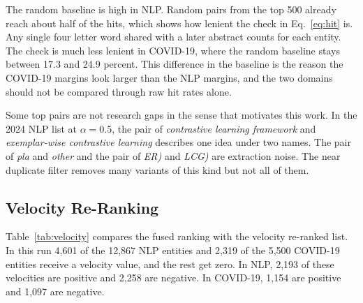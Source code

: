 \documentclass{ieeeaccess}
\begin{document}
\begin{table}[t]
\caption{Hit rate in percent of the ranking at $\alpha = 0.5$ against the two references. Each value is out of 75 pairs.}
\label{tab:hitrate}
\footnotesize
\setlength{\tabcolsep}{3pt}
\end{table}

The random baseline is high in NLP. Random pairs from the top 500 already reach about half of the hits, which shows how lenient the check in Eq.~\eqref{eq:hit} is. Any single four letter word shared with a later abstract counts for each entity. The check is much less lenient in COVID-19, where the random baseline stays between 17.3 and 24.9 percent. This difference in the baseline is the reason the COVID-19 margins look larger than the NLP margins, and the two domains should not be compared through raw hit rates alone.

Some top pairs are not research gaps in the sense that motivates this work. In the 2024 NLP list at $\alpha = 0.5$, the pair of \textit{contrastive learning framework} and \textit{exemplar-wise contrastive learning} describes one idea under two names. The pair of \textit{pla} and \textit{other} and the pair of \textit{ER)} and \textit{LCG)} are extraction noise. The near duplicate filter removes many variants of this kind but not all of them.

\subsection{Velocity Re-Ranking}

Table~\ref{tab:velocity} compares the fused ranking with the velocity re-ranked list. In this run 4,601 of the 12,867 NLP entities and 2,319 of the 5,500 COVID-19 entities receive a velocity value, and the rest get zero. In NLP, 2,193 of these velocities are positive and 2,258 are negative. In COVID-19, 1,154 are positive and 1,097 are negative.
\end{document}
